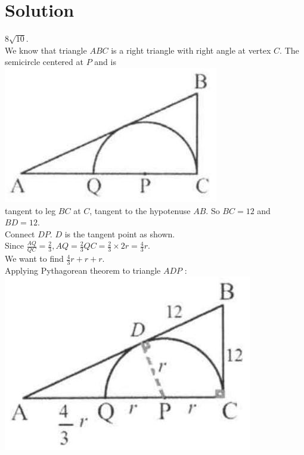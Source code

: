 \documentclass{article}
\begin{document}
\section*{Solution}
\(8 \sqrt{10}\).\\
We know that triangle \(A B C\) is a right triangle with right angle at vertex \(C\). The semicircle centered at \(P\) and is\\
\centering
\includegraphics[width=\textwidth]{images/problem_image_1.jpg}\\
tangent to leg \(B C\) at \(C\), tangent to the hypotenuse \(A B\). So \(B C=12\) and \(B D=12\).\\
Connect \(D P\). \(D\) is the tangent point as shown.\\
Since \(\frac{A Q}{Q C}=\frac{2}{3}, A Q=\frac{2}{3} Q C=\frac{2}{3} \times 2 r=\frac{4}{3} r\).\\
We want to find \(\frac{4}{3} r+r+r\).\\
Applying Pythagorean theorem to triangle \(A D P\) :\\
\centering
\includegraphics[width=\textwidth]{images/reasoning_image_1.jpg}\\
\end{document}
